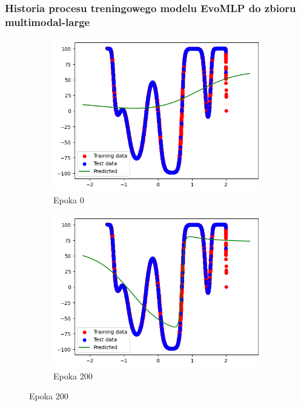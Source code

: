 \documentclass{article}
\begin{document}
\newpage
\subsubsection*{Historia procesu treningowego modelu EvoMLP do zbioru multimodal-large}
\begin{figure}[H]
    \centering
    \begin{subfigure}{0.32\textwidth}
        \includegraphics[width=\linewidth]{img/ae3/mml1.png}
        \caption{Epoka 0}
    \end{subfigure}
    \hfill
    \begin{subfigure}{0.32\textwidth}
        \includegraphics[width=\linewidth]{img/ae3/mml2.png}
        \caption{Epoka 200}
    \end{subfigure}

\end{figure}
\end{document}
